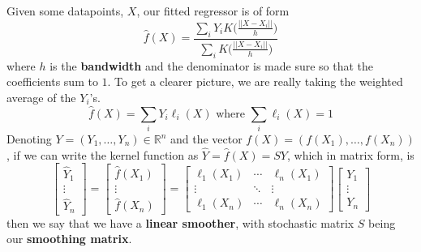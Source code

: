 \documentclass{article}
\begin{document}
    \begin{definition}
      Given some datapoints, $X$, our fitted regressor is of form 
      \begin{equation}
        \hat{f} (X) = \frac{\sum_{i} Y_i K \bigg( \frac{||X - X_i||}{h} \bigg)}{\sum_{i} K \bigg( \frac{||X - X_i||}{h} \bigg)}
      \end{equation}
      where $h$ is the \textbf{bandwidth} and the denominator is made sure so that the coefficients sum to $1$. To get a clearer picture, we are really taking the weighted average of the $Y_i$'s. 
      \begin{equation}
        \hat{f} (X) = \sum_{i} Y_i \ell_i (X) \text{ where } \sum_{i} \ell_i (X) = 1
      \end{equation}
      Denoting $Y = (Y_1, \ldots, Y_n) \in \mathbb{R}^n$ and the vector $f(X) = (f(X_1), \ldots, f(X_n))$, if we can write the kernel function as $\hat{Y} = \hat{f}(X) = S Y$, which in matrix form, is 
      \begin{equation}
        \begin{bmatrix} \hat{Y}_1 \\ \vdots \\ \hat{Y}_n \end{bmatrix} = \begin{bmatrix} \hat{f}(X_1) \\ \vdots \\ \hat{f} (X_n) \end{bmatrix} = \begin{bmatrix} \ell_1 (X_1) & \cdots & \ell_n (X_1) \\ \vdots & \ddots & \vdots \\ \ell_1 (X_n) & \cdots & \ell_n (X_n) \end{bmatrix} \begin{bmatrix} Y_1 \\ \vdots \\ Y_n \end{bmatrix} 
      \end{equation}
      then we say that we have a \textbf{linear smoother}, with stochastic matrix $S$ being our \textbf{smoothing matrix}. 
    \end{definition}
\end{document}
